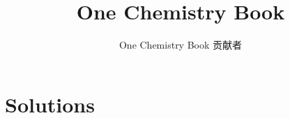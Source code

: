 \documentclass[11pt,a4paper,twoside,openany]{book}
\title{One Chemistry Book}
\author{One Chemistry Book 贡献者}
\date{\bookdate}
\begin{document}
\mainmatter
\setcounter{chapter}{6}

\appendix
\chapter{Solutions}

\end{document}
